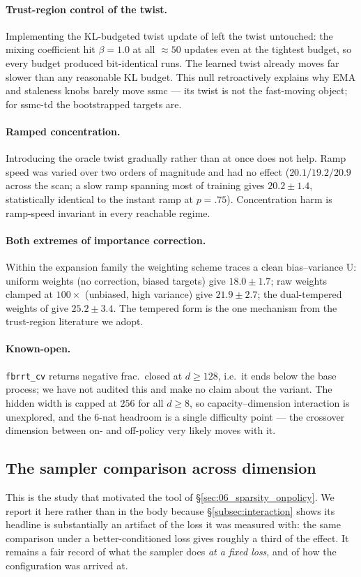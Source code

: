 \paragraph{Trust-region control of the twist.}
Implementing the KL-budgeted twist update of \citet{wang2026tritsmc} left the
twist untouched: the mixing coefficient hit $\beta=1.0$ at all $\approx50$
updates even at the tightest budget, so every budget produced bit-identical
runs. The learned twist already moves far slower than any reasonable KL
budget. This null retroactively explains why EMA and staleness knobs barely
move ssmc --- its twist is not the fast-moving object; for ssmc-td the
bootstrapped targets are.

\paragraph{Ramped concentration.}
Introducing the oracle twist gradually rather than at once does not help. Ramp
speed was varied over two orders of magnitude and had no effect
($20.1/19.2/20.9$ across the scan; a slow ramp spanning most of training gives
$20.2\pm1.4$, statistically identical to the instant ramp at $p=.75$).
Concentration harm is ramp-speed invariant in every reachable regime.

\paragraph{Both extremes of importance correction.}
Within the expansion family the weighting scheme traces a clean bias--variance
U: uniform weights (no correction, biased targets) give $18.0\pm1.7$; raw
weights clamped at $100\times$ (unbiased, high variance) give $21.9\pm2.7$; the
dual-tempered weights of \citet{wang2026tritsmc} give $25.2\pm3.4$. The
tempered form is the one mechanism from the trust-region literature we adopt.

\paragraph{Known-open.}
\texttt{fbrrt\_cv} returns negative frac.\ closed at $d\ge128$, i.e.\ it ends
below the base process; we have not audited this and make no claim about the
variant. The hidden width is capped at $256$ for all $d\ge8$, so
capacity--dimension interaction is unexplored, and the $6$-nat headroom is a
single difficulty point --- the crossover dimension between on- and off-policy
very likely moves with it.

\subsection{The sampler comparison across dimension}
\label{subsec:b-dimscaling}
This is the study that motivated the tool of \S\ref{sec:06_sparsity_onpolicy}.
We report it here rather than in the body because
\S\ref{subsec:interaction} shows its headline is substantially an artifact of
the loss it was measured with: the same comparison under a better-conditioned
loss gives roughly a third of the effect. It remains a fair record of what the
sampler does \emph{at a fixed loss}, and of how the configuration was arrived
at.

